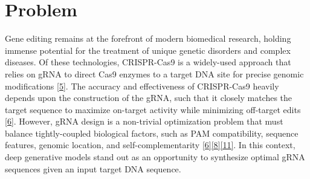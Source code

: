 \documentclass{article}
\begin{document}
\vspace{-1em}

\section{Problem}
Gene editing remains at the forefront of modern biomedical research, holding immense potential for the treatment of unique genetic disorders and complex diseases. Of these technologies, CRISPR-Cas9 is a widely-used approach that relies on gRNA to direct Cas9 enzymes to a target DNA site for precise genomic modifications \hyperref[Reference 5]{[5]}. The accuracy and effectiveness of CRISPR-Cas9 heavily depends upon the construction of the gRNA, such that it closely matches the target sequence to maximize on-target activity while minimizing off-target edits \hyperref[Reference 6]{[6]}. However, gRNA design is a non-trivial optimization problem that must balance tightly-coupled biological factors, such as PAM compatibility, sequence features, genomic location, and self-complementarity \hyperref[Reference 6]{[6]}\hyperref[Reference 8]{[8]}\hyperref[Reference 11]{[11]}. In this context, deep generative models stand out as an opportunity to synthesize optimal gRNA sequences given an input target DNA sequence.  
\end{document}

